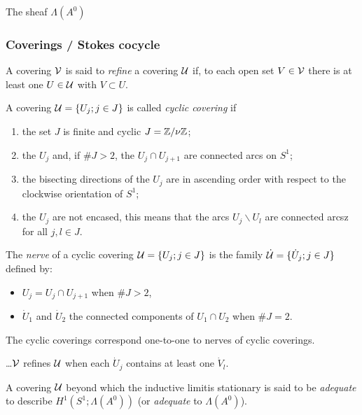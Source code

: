 \TODO
\begin{defn}
  The sheaf $\Lambda(A^0)$
\end{defn}

\subsubsection{Coverings / Stokes cocycle}
\begin{comment}
  \cite{Loday1994} \$II.1
\end{comment}
A covering $\mathcal{V}$ is said to \emph{refine} a covering $\mathcal{U}$ if, to each open set
$V\in\mathcal{V}$ there is at least one $U\in\mathcal{U}$ with $V\subset U$.
\begin{defn}
  A covering $\mathcal{U}=\{U_j;j\in J\}$ is called \emph{cyclic covering} if
  \begin{enumerate}
    \item the set $J$ is finite and cyclic $J=\mathbb{Z}/\nu\mathbb{Z}$;
    \item the $U_j$ and, if $\#J>2$, the $U_j\cap U_{j+1}$ are connected arcs on
      $S^1$;
    \item the bisecting directions of the $U_j$ are in ascending order with
      respect to the clockwise orientation of $S^1$;
    \item the $U_j$ are not encased, this means that the arcs
      $U_j\backslash U_l$ are connected arcsz for all $j,l\in J$.
  \end{enumerate}
\end{defn}
\begin{defn}
  The \emph{nerve} of a cyclic covering $\mathcal{U}=\{U_j;j\in J\}$ is the family
  $\dot{\mathcal{U}}=\{\dot U_j;j\in J\}$ defined by:
  \begin{itemize}
    \item $U_j=U_j\cap U_{j+1}$ when $\#J>2$,
    \item $\dot U_1$ and $\dot U_2$ the connected components of $U_1\cap U_2$
      when $\#J=2$.
  \end{itemize}
\end{defn}
The cyclic coverings correspond one-to-one to nerves of cyclic coverings.
\begin{prop}
  \dots $\mathcal{V}$ refines $\mathcal{U}$ when each $\dot U_j$ contains at least one
  $\dot V_l$.
\end{prop}

\begin{defn}
  A covering $\mathcal{U}$ beyond which the inductive limit\TODO[which] is stationary
  is said to be \emph{adequate} to describe $H^1(S^1;\Lambda(A^0))$ (or
  \emph{adequate} to $\Lambda(A^0)$).
\end{defn}


